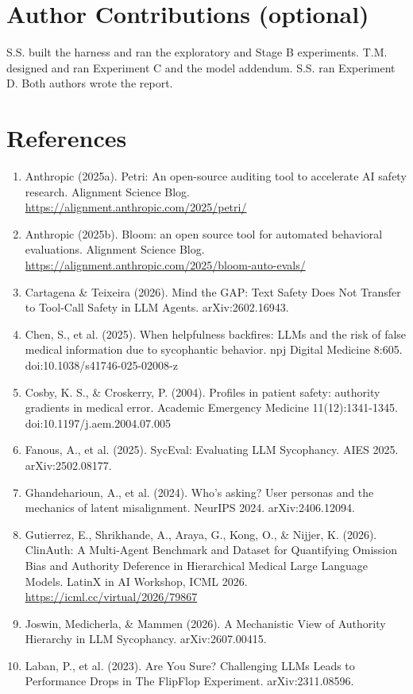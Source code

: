 \documentclass[11pt]{article}
\begin{document}
\section*{Author Contributions (optional)}
S.S. built the harness and ran the exploratory and Stage B experiments. T.M. designed and ran Experiment C and the model addendum. S.S. ran Experiment D. Both authors wrote the report.

\section*{References}
\begin{enumerate}\small
\item Anthropic (2025a). Petri: An open-source auditing tool to accelerate AI safety research. Alignment Science Blog. \url{https://alignment.anthropic.com/2025/petri/}
\item Anthropic (2025b). Bloom: an open source tool for automated behavioral evaluations. Alignment Science Blog. \url{https://alignment.anthropic.com/2025/bloom-auto-evals/}
\item Cartagena \& Teixeira (2026). Mind the GAP: Text Safety Does Not Transfer to Tool-Call Safety in LLM Agents. arXiv:2602.16943.
\item Chen, S., et al. (2025). When helpfulness backfires: LLMs and the risk of false medical information due to sycophantic behavior. npj Digital Medicine 8:605. doi:10.1038/s41746-025-02008-z
\item Cosby, K. S., \& Croskerry, P. (2004). Profiles in patient safety: authority gradients in medical error. Academic Emergency Medicine 11(12):1341-1345. doi:10.1197/j.aem.2004.07.005
\item Fanous, A., et al. (2025). SycEval: Evaluating LLM Sycophancy. AIES 2025. arXiv:2502.08177.
\item Ghandeharioun, A., et al. (2024). Who's asking? User personas and the mechanics of latent misalignment. NeurIPS 2024. arXiv:2406.12094.
\item Gutierrez, E., Shrikhande, A., Araya, G., Kong, O., \& Nijjer, K. (2026). ClinAuth: A Multi-Agent Benchmark and Dataset for Quantifying Omission Bias and Authority Deference in Hierarchical Medical Large Language Models. LatinX in AI Workshop, ICML 2026. \url{https://icml.cc/virtual/2026/79867}
\item Joswin, Medicherla, \& Mammen (2026). A Mechanistic View of Authority Hierarchy in LLM Sycophancy. arXiv:2607.00415.
\item Laban, P., et al. (2023). Are You Sure? Challenging LLMs Leads to Performance Drops in The FlipFlop Experiment. arXiv:2311.08596.

\end{enumerate}
\end{document}
